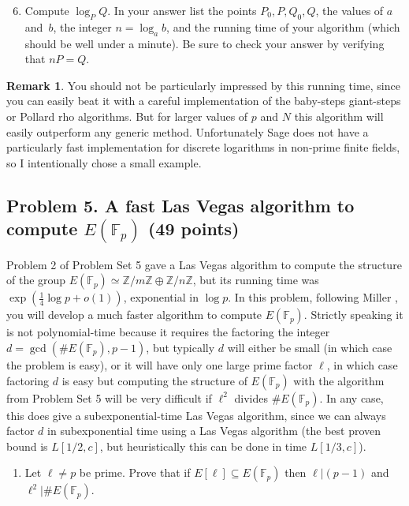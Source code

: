 \documentclass[11pt]{article}
\newcommand{\Fp}{\mathbb{F}_p}
\newcommand{\Z}{\mathbb{Z}}
\theoremstyle{definition}
\newtheorem*{remark}{Remark}
\begin{document}
\begin{enumerate}[{\bf(a)}]
\setcounter{enumi}{5}
\item Compute $\log_P Q$.  In your answer list the points $P_0,P,Q_0,Q$, the values of $a$ and~$b$, the integer $n=\log_a b$, and the running time of your algorithm (which should be well under a minute).
Be sure to check your answer by verifying that $nP=Q$.
\end{enumerate}

\begin{remark}
You should not be particularly impressed by this running time, since you can easily beat it with a careful implementation of the baby-steps giant-steps or Pollard rho algorithms.
But for larger values of $p$ and $N$ this algorithm will easily outperform any generic method.
Unfortunately Sage does not have a particularly fast implementation for discrete logarithms in non-prime finite fields, so I intentionally chose a small example.
\end{remark}

\subsection*{Problem 5. A fast Las Vegas algorithm to compute ${E(\Fp)}$ (49 points)}

Problem 2 of Problem Set 5 gave a Las Vegas algorithm to compute the structure of the group $E(\Fp)\simeq \Z/m\Z\oplus\Z/n\Z$, but its running time was $\exp(\frac{1}{4}\log p+o(1))$, exponential in $\log p$.
In this problem, following Miller \cite{miller}, you will develop a much faster algorithm to compute $E(\Fp)$.
Strictly speaking it is not polynomial-time because it requires the factoring the integer $d=\gcd(\#E(\Fp),p-1)$, but typically $d$ will either be small (in which case the problem is easy), or it will have only one large prime factor $\ell$, in which case factoring $d$ is easy but computing the structure of $E(\Fp)$ with the algorithm from Problem Set 5 will be very difficult if $\ell^2$ divides $\#E(\Fp)$.
In any case, this does give a subexponential-time Las Vegas algorithm, since we can always factor $d$ in subexponential time using a Las Vegas algorithm (the best proven bound is $L[1/2,c]$, but heuristically this can be done in time $L[1/3,c]$).

\begin{enumerate}[{\bf(a)}]
\item Let $\ell\ne p$ be prime.  Prove that if $E[\ell]\subseteq E(\Fp)$ then $\ell|(p-1)$ and $\ell^2|\#E(\Fp)$.
\end{enumerate}
\end{document}
